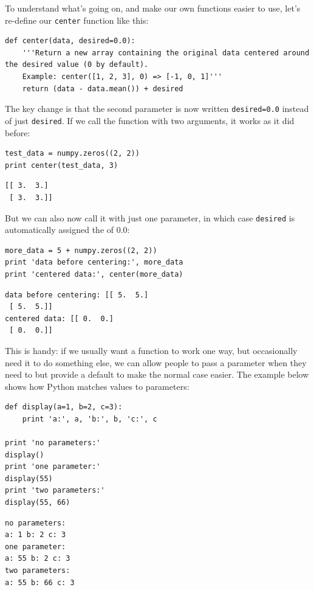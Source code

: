 \documentclass{book}
\begin{document}
To understand what's going on, and make our own functions easier to use,
let's re-define our \texttt{center} function like this:

\begin{verbatim}
def center(data, desired=0.0):
    '''Return a new array containing the original data centered around the desired value (0 by default).
    Example: center([1, 2, 3], 0) => [-1, 0, 1]'''
    return (data - data.mean()) + desired
\end{verbatim}

The key change is that the second parameter is now written
\texttt{desired=0.0} instead of just \texttt{desired}. If we call the
function with two arguments, it works as it did before:

\begin{verbatim}
test_data = numpy.zeros((2, 2))
print center(test_data, 3)
\end{verbatim}

\begin{verbatim}
[[ 3.  3.]
 [ 3.  3.]]
\end{verbatim}

But we can also now call it with just one parameter, in which case
\texttt{desired} is automatically assigned the
 of 0.0:

\begin{verbatim}
more_data = 5 + numpy.zeros((2, 2))
print 'data before centering:', more_data
print 'centered data:', center(more_data)
\end{verbatim}

\begin{verbatim}
data before centering: [[ 5.  5.]
 [ 5.  5.]]
centered data: [[ 0.  0.]
 [ 0.  0.]]
\end{verbatim}

This is handy: if we usually want a function to work one way, but
occasionally need it to do something else, we can allow people to pass a
parameter when they need to but provide a default to make the normal
case easier. The example below shows how Python matches values to
parameters:

\begin{verbatim}
def display(a=1, b=2, c=3):
    print 'a:', a, 'b:', b, 'c:', c

print 'no parameters:'
display()
print 'one parameter:'
display(55)
print 'two parameters:'
display(55, 66)
\end{verbatim}

\begin{verbatim}
no parameters:
a: 1 b: 2 c: 3
one parameter:
a: 55 b: 2 c: 3
two parameters:
a: 55 b: 66 c: 3
\end{verbatim}
\end{document}
